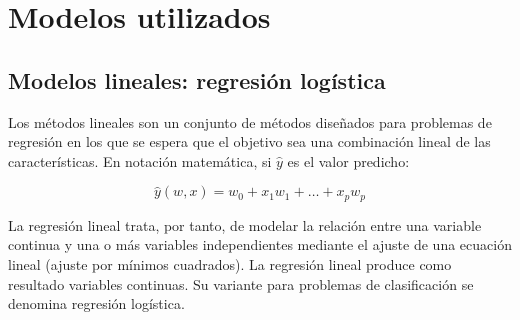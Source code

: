 
\section{Modelos utilizados}
\label{sec:models}


\subsection{Modelos lineales: regresión logística}

Los métodos lineales son un conjunto de métodos diseñados para problemas de regresión en los que se espera que el objetivo sea una combinación lineal de las características.
En notación matemática, si $\hat{y}$ es el valor predicho:

\begin{equation}
    \hat{y}(w,x)=w_{0} + x_{1}w_{1} + \dots + x_{p}w_{p}
\end{equation}

La regresión lineal trata, por tanto, de modelar la relación entre una variable continua y una o más variables independientes mediante el ajuste de una ecuación lineal (ajuste por mínimos cuadrados). La regresión lineal produce como resultado variables continuas. Su variante para problemas de clasificación se denomina regresión logística. 




